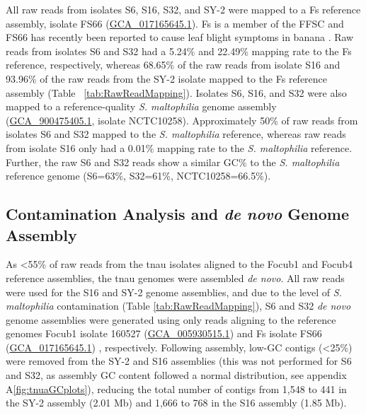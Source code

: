 All raw reads from isolates S6, S16, S32, and SY-2 were mapped to a \acf{Fs} reference assembly, isolate FS66 (\href{https://www.ncbi.nlm.nih.gov/datasets/genome/GCA_017165645.1/}{GCA\_017165645.1}). \ac{Fs} is a member of the \acf{FFSC} and FS66 has recently been reported to cause leaf blight symptoms in banana \parencite{Cui2021}. Raw reads from isolates S6 and S32 had a 5.24\% and 22.49\% mapping rate to the \ac{Fs} reference, respectively, whereas 68.65\% of the raw reads from isolate S16 and 93.96\% of the raw reads from the SY-2 isolate mapped to the \ac{Fs} reference assembly (Table ~\ref{tab:RawReadMapping}). Isolates S6, S16, and S32 were also mapped to a reference-quality \textit{S. maltophilia} genome assembly (\href{https://www.ncbi.nlm.nih.gov/datasets/genome/GCF_900475405.1/}{GCA\_900475405.1}, isolate NCTC10258). Approximately 50\% of raw reads from isolates S6 and S32 mapped to the \textit{S. maltophilia} reference, whereas raw reads from isolate S16 only had a 0.01\% mapping rate to the \textit{S. maltophilia} reference. Further, the raw S6 and S32 reads show a similar GC\% to the \textit{S. maltophilia} reference genome (S6=63\%, S32=61\%, NCTC10258=66.5\%).

\bigskip


\subsection{Contamination Analysis and \textit{de novo} Genome Assembly}

As <55\% of raw reads from the \ac{tnau} isolates aligned to the \ac{Focub1} and \ac{Focub4} reference assemblies, the \ac{tnau} genomes were assembled \textit{de novo}. All raw reads were used for the S16 and SY-2 genome assemblies, and due to the level of \textit{S. maltophilia} contamination (Table \ref{tab:RawReadMapping}), S6 and S32 \textit{de novo} genome assemblies were generated using only reads aligning to the reference genomes \ac{Focub1} isolate 160527 (\href{https://www.ncbi.nlm.nih.gov/datasets/genome/GCA_005930515.1/}{GCA\_005930515.1}) \parencite{Asai2019} and \ac{Fs} isolate FS66 (\href{https://www.ncbi.nlm.nih.gov/datasets/genome/GCA_017165645.1/}{GCA\_017165645.1}) \parencite{Cui2021}, respectively. Following assembly, low-GC contigs  (\textless 25\%) were removed from the SY-2 and S16 assemblies (this was not performed for S6 and S32, as assembly GC content followed a normal distribution, see appendix A\ref{fig:tnuaGCplots}), reducing the total number of contigs from 1,548 to 441 in the SY-2 assembly (2.01 Mb) and 1,666 to 768 in the S16 assembly (1.85 Mb).  

